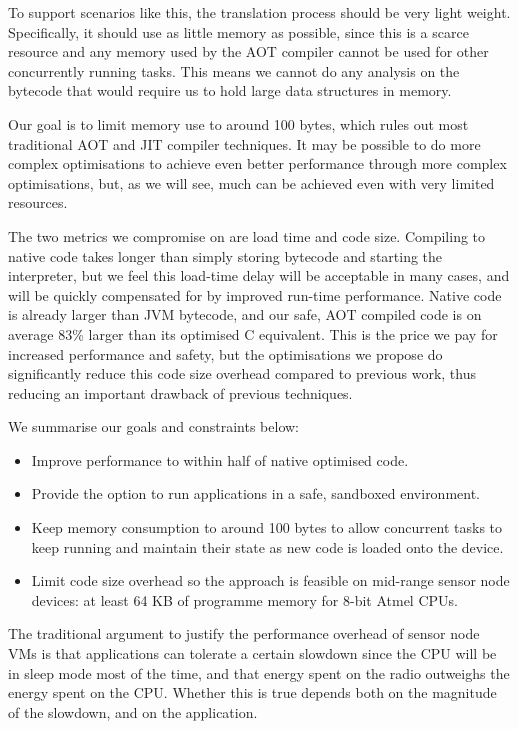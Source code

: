 To support scenarios like this, the translation process should be very light weight. Specifically, it should use as little memory as possible, since this is a scarce resource and any memory used by the AOT compiler cannot be used for other concurrently running tasks. This means we cannot do any analysis on the bytecode that would require us to hold large data structures in memory.

Our goal is to limit memory use to around 100 bytes, which rules out most traditional AOT and JIT compiler techniques. It may be possible to do more complex optimisations to achieve even better performance through more complex optimisations, but, as we will see, much can be achieved even with very limited resources.

The two metrics we compromise on are load time and code size. Compiling to native code takes longer than simply storing bytecode and starting the interpreter, but we feel this load-time delay will be acceptable in many cases, and will be quickly compensated for by improved run-time performance. Native code is already larger than JVM bytecode, and our safe, AOT compiled code is on average 83\% larger than its optimised C equivalent. This is the price we pay for increased performance and safety, but the optimisations we propose do significantly reduce this code size overhead compared to previous work, thus reducing an important drawback of previous techniques.

We summarise our goals and constraints below:
\begin{itemize}
  \item Improve performance to within half of native optimised code.
  \item Provide the option to run applications in a safe, sandboxed environment.
  \item Keep memory consumption to around 100 bytes to allow concurrent tasks to keep running and maintain their state as new code is loaded onto the device.
  \item Limit code size overhead so the approach is feasible on mid-range sensor node devices: at least 64 KB of programme memory for 8-bit Atmel CPUs.
\end{itemize}

The traditional argument to justify the performance overhead of sensor node VMs is that applications can tolerate a certain slowdown since the CPU will be in sleep mode most of the time, and that energy spent on the radio outweighs the energy spent on the CPU. Whether this is true depends both on the magnitude of the slowdown, and on the application.

